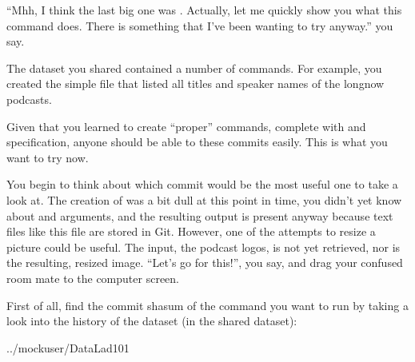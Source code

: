 \sphinxAtStartPar
“Mhh, I think the last big one was .
Actually, let me quickly show you what this command
does. There is something that I’ve been wanting to try
anyway.” you say.

\sphinxAtStartPar
The dataset you shared contained a number of 
commands. For example, you created the simple 
file that listed all titles and speaker names of the longnow
podcasts.

\sphinxAtStartPar
Given that you learned to create “proper”  commands,
complete with  and  specification,
anyone should be able to  these commits
easily. This is what you want to try now.

\sphinxAtStartPar
You begin to think about which  commit would be
the most useful one to take a look at. The creation of
 was a bit dull \textendash{} at this point in time, you
didn’t yet know about  and  arguments,
and the resulting output is present anyway because text files
like this  file are stored in Git.
However, one of the attempts to resize a picture could be
useful. The input, the podcast logos, is not yet retrieved,
nor is the resulting, resized image. “Let’s go for this!”,
you say, and drag your confused room mate to the computer
screen.

\sphinxAtStartPar
First of all, find the commit shasum of the command you
want to run by taking a look into the history of the dataset
(in the shared dataset):

\begin{sphinxVerbatim}[commandchars=\\\{\}]
../mock\PYGZus{}user/DataLad\PYGZhy{}101
\end{sphinxVerbatim}

